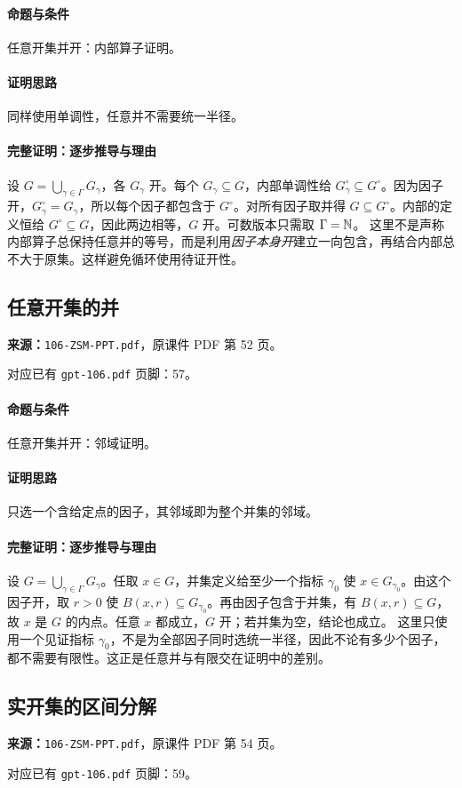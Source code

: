 \paragraph{命题与条件}任意开集并开：内部算子证明。
\paragraph{证明思路}同样使用单调性，任意并不需要统一半径。
\paragraph{完整证明：逐步推导与理由}
设 $G=\bigcup_{\gamma\in\Gamma}G_\gamma$，各 $G_\gamma$ 开。每个 $G_\gamma\subseteq G$，内部单调性给 $G_\gamma^\circ\subseteq G^\circ$。因为因子开，$G_\gamma^\circ=G_\gamma$，所以每个因子都包含于 $G^\circ$。对所有因子取并得 $G\subseteq G^\circ$。内部的定义恒给 $G^\circ\subseteq G$，因此两边相等，$G$ 开。可数版本只需取 $\Gamma=\mathbb{N}$。
这里不是声称内部算子总保持任意并的等号，而是利用\emph{因子本身开}建立一向包含，再结合内部总不大于原集。这样避免循环使用待证开性。
\clearpage\subsection{任意开集的并}
\textbf{来源：}\texttt{106-ZSM-PPT.pdf}，原课件 PDF 第 52 页。\par
对应已有 \texttt{gpt-106.pdf} 页脚：57。\par
\paragraph{命题与条件}任意开集并开：邻域证明。
\paragraph{证明思路}只选一个含给定点的因子，其邻域即为整个并集的邻域。
\paragraph{完整证明：逐步推导与理由}
设 $G=\bigcup_{\gamma\in\Gamma}G_\gamma$。任取 $x\in G$，并集定义给至少一个指标 $\gamma_0$ 使 $x\in G_{\gamma_0}$。由这个因子开，取 $r>0$ 使 $B(x,r)\subseteq G_{\gamma_0}$。再由因子包含于并集，有 $B(x,r)\subseteq G$，故 $x$ 是 $G$ 的内点。任意 $x$ 都成立，$G$ 开；若并集为空，结论也成立。
这里只使用一个见证指标 $\gamma_0$，不是为全部因子同时选统一半径，因此不论有多少个因子，都不需要有限性。这正是任意并与有限交在证明中的差别。
\clearpage\subsection{实开集的区间分解}
\textbf{来源：}\texttt{106-ZSM-PPT.pdf}，原课件 PDF 第 54 页。\par
对应已有 \texttt{gpt-106.pdf} 页脚：59。\par
